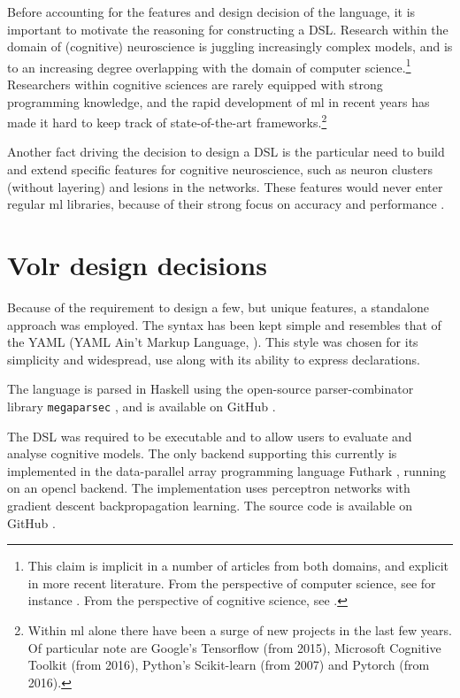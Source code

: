 \documentclass[a4paper,oneside]{memoir}
\begin{document}
Before accounting for the features and design decision of the language, it is
important to motivate the reasoning for constructing a DSL.
Research within the domain of (cognitive) neuroscience is juggling increasingly
complex models, and is to an increasing degree overlapping with the domain of
computer science.\footnote{This claim is implicit in a number of articles from both
domains, and explicit in more recent literature. From the perspective of computer
science, see for instance \autocite{Nilsson2009, walter2015, schmidhuber2014,
russel2007}. From the perspective of cognitive science, see \autocite{Hohwy2009,
dennett2017, dayan2001, sep:cognitive-science}.} Researchers within cognitive
sciences are rarely equipped with strong programming knowledge, and the rapid
development of \gls{ml} in recent years has made it hard to keep track of
state-of-the-art frameworks.\footnote{Within \gls{ml} alone there have been
a surge of new projects in the last few years. Of particular note are
Google's Tensorflow (from 2015), Microsoft Cognitive Toolkit (from 2016),
Python's Scikit-learn (from 2007) and Pytorch (from 2016).}

Another fact driving the decision to design a DSL is the particular need to
build and extend specific features for cognitive neuroscience, such as
neuron clusters (without layering) and lesions in the networks. These features
would never enter regular \gls{ml} libraries, because of their strong
focus on accuracy and performance \autocite{Nilsson2009, schmidhuber2014}.

\section{Volr design decisions}
Because of the requirement to design a few, but unique features, a standalone
approach was employed. The syntax has been kept simple and resembles that of
the YAML (YAML Ain't Markup Language, \cite{yaml}). This style was chosen for
its simplicity and widespread, use along with its ability to express declarations.

The language is parsed in Haskell using the open-source parser-combinator
library \texttt{megaparsec} \autocite{megaparsec}, and is available on GitHub
\autocite{Pedersen2018:volr}.

The DSL was required to be executable and to allow users to evaluate and
analyse cognitive models. The only backend supporting this currently is implemented
in the data-parallel array programming language Futhark
\autocite{Henriksen2017}, running on an \gls{opencl} backend. The implementation
uses perceptron networks with gradient descent backpropagation learning. The
source code is available on GitHub \autocite{Pedersen2018:futhark}.
\end{document}
